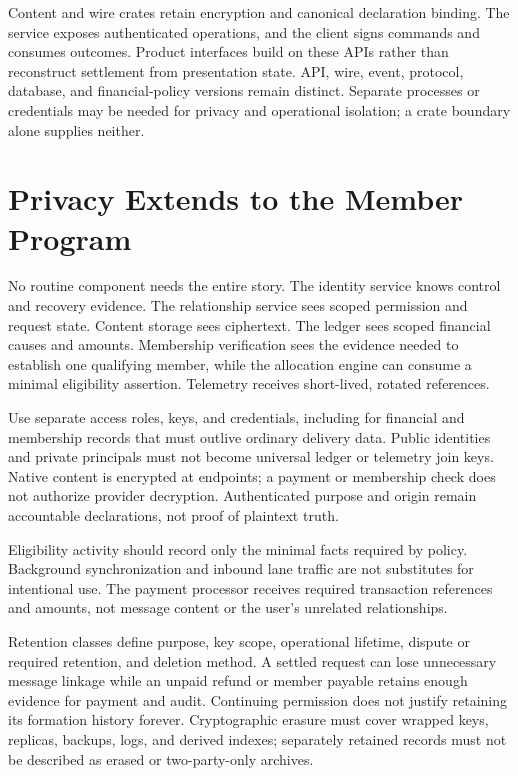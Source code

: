 \documentclass[11pt]{article}
\begin{document}
Content and wire crates retain encryption and canonical declaration binding.
The service exposes authenticated operations, and the client signs commands and
consumes outcomes. Product interfaces build on these APIs rather than reconstruct
settlement from presentation state. API, wire, event, protocol, database, and
financial-policy versions remain distinct. Separate processes or credentials may
be needed for privacy and operational isolation; a crate boundary alone supplies
neither.

\section{Privacy Extends to the Member Program}

No routine component needs the entire story. The identity service knows control
and recovery evidence. The relationship service sees scoped permission and request
state. Content storage sees ciphertext. The ledger sees scoped financial causes
and amounts. Membership verification sees the evidence needed to establish one
qualifying member, while the allocation engine can consume a minimal eligibility
assertion. Telemetry receives short-lived, rotated references.

Use separate access roles, keys, and credentials, including for financial and
membership records that must outlive ordinary delivery data. Public identities
and private principals must not become universal ledger or telemetry join keys.
Native content is encrypted at endpoints; a payment or membership check does
not authorize provider decryption. Authenticated purpose and origin remain
accountable declarations, not proof of plaintext truth.

Eligibility activity should record only the minimal facts required by policy.
Background synchronization and inbound lane traffic are not substitutes for
intentional use. The payment processor receives required transaction references
and amounts, not message content or the user's unrelated relationships.

Retention classes define purpose, key scope, operational lifetime, dispute or
required retention, and deletion method. A settled request can lose unnecessary
message linkage while an unpaid refund or member payable retains enough evidence
for payment and audit. Continuing permission does not justify retaining its
formation history forever. Cryptographic erasure must cover wrapped keys,
replicas, backups, logs, and derived indexes; separately retained records must
not be described as erased or two-party-only archives.
\end{document}
